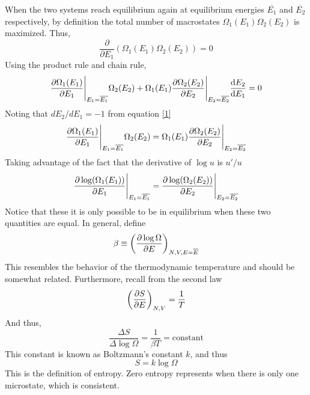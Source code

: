 \documentclass{article}
\begin{document}
\begin{itemize}
\begin{derivation}
        When the two systems reach equilibrium again at equilibrium energies $\overline{E_1}$ and $\overline{E_2}$ respectively, by definition the total number of macrostates $\Omega_1(E_1)\Omega_2(E_2)$ is maximized. Thus,
        \begin{equation}
            \frac{\partial}{\partial E_1}(\Omega_1(E_1)\Omega_2(E_2))=0
        \end{equation}
        Using the product rule and chain rule,
        \begin{equation}
            \partialderivative{\Omega_1(E_1)}{E_1}\Bigg|_{E_1=\overline{E_1}}\Omega_2(E_2)+\Omega_1(E_1)\partialderivative{\Omega_2(E_2)}{E_2}\Bigg|_{E_2=\overline{E_2}}\derivative{E_2}{E_1}=0\label{equilibrium-conducting}
        \end{equation}
        Noting that $dE_2/dE_1=-1$ from equation \eqref{1}
        \begin{equation}
            \partialderivative{\Omega_1(E_1)}{E_1}\Bigg|_{E_1=\overline{E_1}}\Omega_2(E_2)=\Omega_1(E_1)\partialderivative{\Omega_2(E_2)}{E_2}\Bigg|_{E_2=\overline{E_2}}
        \end{equation}
        Taking advantage of the fact that the derivative of $\log u$ is $u'/u$
        \begin{equation}
            \partialderivative{\log(\Omega_1(E_1))}{E_1}\Bigg|_{E_1=\overline{E_1}}=\partialderivative{\log(\Omega_2(E_2))}{E_2}\Bigg|_{E_2=\overline{E_2}}\label{equilibrium-conducting-2}
        \end{equation}
        Notice that these it is only possible to be in equilibrium when these two quantities are equal. In general, define
        \begin{equation}
            \beta\equiv\left(\partialderivative{\log\Omega}{E}\right)_{N,V,E=\overline{E}}
        \end{equation} 
        This resembles the behavior of the thermodynamic temperature and should be somewhat related. Furthermore, recall from the second law
        \begin{equation}
            \left(\partialderivative{S}{E}\right)_{N,V}=\frac{1}{T}
        \end{equation}
        And thus,
        \begin{equation}
            \frac{\Delta S}{\Delta \log\Omega}=\frac{1}{\beta T}=\text{constant}
        \end{equation}
        This constant is known as Boltzmann's constant $k$, and thus
        \begin{equation}
            S=k\log\Omega\label{entropy}
        \end{equation}
        This is the definition of entropy. Zero entropy represents when there is only one microstate, which is consistent.   
    \end{derivation}


\end{itemize}
\end{document}
